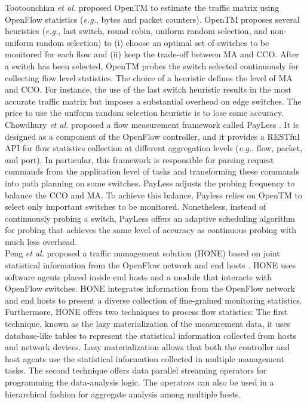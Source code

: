 Tootoonchian \textit{et al.} proposed OpenTM \cite{Tootoonchian_2010:opentm} to estimate the traffic matrix using OpenFlow statistics (\textit{e.g.}, bytes and packet counters). OpenTM proposes several heuristics (\textit{e.g.}, last switch, round robin, uniform random selection, and non-uniform random selection) to (i) choose an optimal set of switches to be monitored for each flow and (ii) keep the trade-off between MA and CCO. After a switch has been selected, OpenTM probes the switch selected continuously for collecting flow level statistics. The choice of a heuristic defines the level of MA and CCO. For instance, the use of the last switch heuristic results in the most accurate traffic matrix but imposes a substantial overhead on edge switches. The price to use the uniform random selection heuristic is to lose some accuracy.\\

Chowdhury \textit{et al.} proposed a flow measurement framework called PayLess \cite{chowdhury_2014:payless}. It is designed as a component of the OpenFlow controller, and it provides a RESTful API for flow statistics collection at different aggregation levels (\textit{e.g.}, flow, packet, and port). In particular,  this framework is responsible for parsing request commands from the application level of tasks and transforming these commands into path planning on some switches. PayLess adjusts the probing frequency to balance the CCO and MA. To achieve this balance, Payless relies on OpenTM \cite{Tootoonchian_2010:opentm} to select only important switches to be monitored. Nonetheless, instead of continuously probing a switch, PayLess offers an adaptive scheduling algorithm for probing that achieves the same level of accuracy as continuous probing with much less overhead.\\

Peng \textit{et al.} proposed a traffic management solution (HONE) based on joint statistical information from the OpenFlow network and end hosts \cite{Sun_2015:HONE}. HONE uses software agents placed inside end hosts and a module that interacts with OpenFlow switches. HONE integrates information from the OpenFlow network and end hosts to present a diverse collection of fine-grained monitoring statistics. Furthermore, HONE offers two techniques to process flow statistics: The first technique, known as the lazy materialization of the measurement data, it uses database-like tables to represent the statistical information collected from hosts and network devices. Lazy materialization allows that both the controller and host agents use the statistical information collected in multiple management tasks. The second technique offers data parallel streaming operators for programming the data-analysis logic. The operators can also be used in a hierarchical fashion for aggregate analysis among multiple hosts.\\

